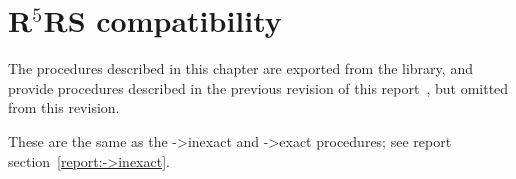 \chapter{R$^5$RS compatibility}
\label{r5rscompatchapter}

The procedures described in this chapter are exported from the
 library, and provide procedures described in the
previous revision of this report~\cite{R5RS}, but omitted from this
revision.

\begin{entry}{%
}

These are the same as the {\cf ->inexact} and {\cf ->exact}
procedures; see report section~\ref{report:->inexact}.
\end{entry}

